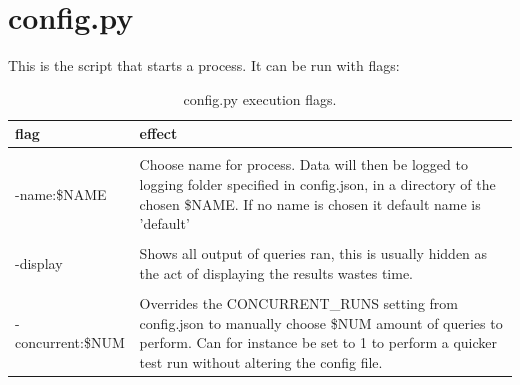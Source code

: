 \documentclass[a4paper,english]{report}
\begin{document}
\section{config.py}
This is the script that starts a process. It can be run with flags:
\begin{table}[H]
	\centering
	\caption{config.py execution flags.}
	\label{table:config_flags}
	\begin{tabular}{p{4cm}p{7cm}}
		\\
		\multicolumn{1}{l}{\bfseries flag} & \multicolumn{1}{l}{\bfseries effect} \\ \hline \\
		-name:\$NAME& Choose name for process. Data will then be logged to logging folder specified in config.json, in a directory of the chosen \$NAME. If no name is chosen it default name is 'default' \\
		\\
		-display & Shows all output of queries ran, this is usually hidden as the act of displaying the results wastes time. \\
		\\
		-concurrent:\$NUM & Overrides the CONCURRENT\_RUNS setting from config.json to manually choose \$NUM amount of queries to perform. Can for instance be set to 1 to perform a quicker test run without altering the config file.  \\
	\end{tabular}
\end{table}
\end{document}
